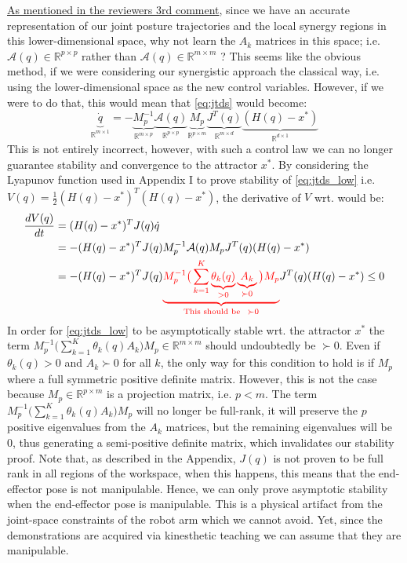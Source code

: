 \documentclass{article}
\begin{document}
\underline{As mentioned in the reviewers 3rd comment}, since we have an accurate representation of our joint posture trajectories and the local synergy regions in this lower-dimensional space, why not learn the $A_k$ matrices in this space; i.e. $\mathcal{A}(q)\in \mathbb{R}^{p\times p}$ rather than $\mathcal{A}(q)\in \mathbb{R}^{m\times m}$ ? This seems like the obvious method, if we were considering our synergistic approach the classical way, i.e. using the lower-dimensional space as the new control variables. However, if we were to do that, this would mean that \eqref{eq:jtds} would become:
\begin{equation}
\underbrace{\dot{q}}_{\mathbb{R}^{m\times 1}} = -\underbrace{M_p^{-1}}_{\mathbb{R}^{m\times p}}\underbrace{\mathcal{A}(q)}_{\mathbb{R}^{p\times p}}\underbrace{M_p}_{\mathbb{R}^{p\times m}}\underbrace{J^{T}(q)}_{\mathbb{R}^{m\times d}}\underbrace{(H(q)-x^*)}_{\mathbb{R}^{d\times 1}}
\label{eq:jtds_low}
\end{equation}
This is not entirely incorrect, however, with such a control law we can no longer guarantee stability and convergence to the attractor $x^{*}$. By considering the Lyapunov function used in Appendix I to prove stability of \eqref{eq:jtds_low} i.e. $V(q) = \frac{1}{2}(H(q) - x^*)^T(H(q) - x^*)$, the derivative of $ V $ wrt. would be:
\begin{equation}
\begin{aligned}
\frac{dV(q)}{dt} &= (H(q) - x^*)^TJ(q)\dot{q}\\
&= -(H(q) - x^*)^TJ(q)M_p^{-1}\mathcal{A}(q)M_pJ^T(q)(H(q) - x^*)\\
&= -(H(q) - x^*)^TJ(q)\textcolor{red}{\underbrace{M_p^{-1}\big(\sum_{k=1}^{K}\underbrace{\theta_k(q)}_{> 0}\underbrace{A_k}_{\succ 0}\big)M_p}_{\text{This should be}~~ \succ 0}}J^T(q)(H(q) - x^*)\leq 0
\end{aligned}
\end{equation}
In order for \eqref{eq:jtds_low} to be asymptotically stable wrt. the attractor $x^*$ the term $M_p^{-1}\big(\sum_{k=1}^{K}\theta_k(q)A_k\big)M_p \in \mathbb{R}^{m\times m}$ should undoubtedly be $\succ 0$. Even if $\theta_k(q) > 0$ and $A_k \succ 0$ for all $k$, the only way for this condition to hold is if $M_p$ where a full symmetric positive definite matrix. However, this is not the case because $M_p\in \mathbb{R}^{p\times m}$  is a projection matrix, i.e. $p<m$. The term $M_p^{-1}\big(\sum_{k=1}^{K}\theta_k(q)A_k\big)M_p$ will no longer be full-rank, it will preserve the $p$ positive eigenvalues from the $A_k$ matrices, but the remaining eigenvalues will be 0, thus generating a semi-positive definite matrix, which invalidates our stability proof. Note that, as described in the Appendix, $J(q)$ is not proven to be full rank in all regions of the workspace, when this happens, this means that the end-effector pose is not manipulable. Hence, we can only prove asymptotic stability when the end-effector pose is manipulable. This is a physical artifact from the joint-space constraints of the robot arm which we cannot avoid. Yet, since the demonstrations are acquired via kinesthetic teaching we can assume that they are manipulable. 
\end{document}
